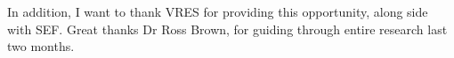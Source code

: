 \documentclass[18pt]{article}
\numberwithin{equation}{section} %
\numberwithin{figure}{section} %
\numberwithin{table}{section} %
\begin{document}
	In addition, I want to thank VRES for providing this opportunity, along side with SEF. Great thanks Dr Ross Brown, for guiding through entire research last two months. \\	
	
\newpage
\begin{flushleft}



\end{flushleft}
\end{document}
